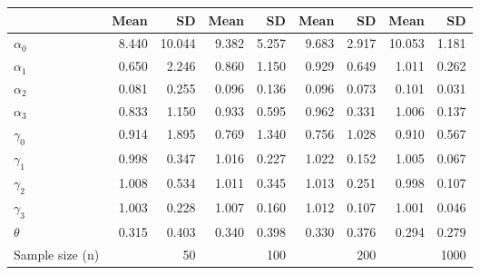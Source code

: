 
\begin{tabular}[t]{lrrrrrrrr}
\toprule
  & Mean & SD & Mean  & SD  & Mean   & SD   & Mean    & SD   \\
\midrule
$\alpha_{0}$ & 8.440 & 10.044 & 9.382 & 5.257 & 9.683 & 2.917 & 10.053 & 1.181\\
$\alpha_{1}$ & 0.650 & 2.246 & 0.860 & 1.150 & 0.929 & 0.649 & 1.011 & 0.262\\
$\alpha_{2}$ & 0.081 & 0.255 & 0.096 & 0.136 & 0.096 & 0.073 & 0.101 & 0.031\\
$\alpha_{3}$ & 0.833 & 1.150 & 0.933 & 0.595 & 0.962 & 0.331 & 1.006 & 0.137\\
$\gamma_{0}$ & 0.914 & 1.895 & 0.769 & 1.340 & 0.756 & 1.028 & 0.910 & 0.567\\
$\gamma_{1}$ & 0.998 & 0.347 & 1.016 & 0.227 & 1.022 & 0.152 & 1.005 & 0.067\\
$\gamma_{2}$ & 1.008 & 0.534 & 1.011 & 0.345 & 1.013 & 0.251 & 0.998 & 0.107\\
$\gamma_{3}$ & 1.003 & 0.228 & 1.007 & 0.160 & 1.012 & 0.107 & 1.001 & 0.046\\
$\theta$ & 0.315 & 0.403 & 0.340 & 0.398 & 0.330 & 0.376 & 0.294 & 0.279\\
Sample size (n) &  & 50 &  & 100 &  & 200 &  & 1000\\
\bottomrule
\end{tabular}
